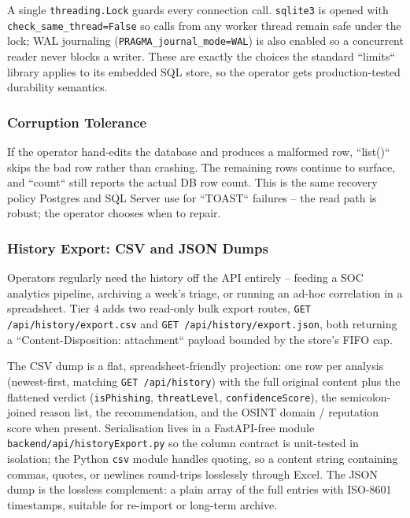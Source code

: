 A single \texttt{threading.Lock} guards every connection call. \texttt{sqlite3} is opened with \texttt{check\_same\_thread=False} so calls from any worker thread remain safe under the lock; WAL journaling (\texttt{PRAGMA\_journal\_mode=WAL}) is also enabled so a concurrent reader never blocks a writer. These are exactly the choices the standard ``limits`` library applies to its embedded SQL store, so the operator gets production-tested durability semantics.

\subsubsection{Corruption Tolerance}

If the operator hand-edits the database and produces a malformed row, ``list()`` skips the bad row rather than crashing. The remaining rows continue to surface, and ``count`` still reports the actual DB row count. This is the same recovery policy Postgres and SQL Server use for ``TOAST`` failures -- the read path is robust; the operator chooses when to repair.

\subsubsection{History Export: CSV and JSON Dumps}

Operators regularly need the history off the API entirely -- feeding a
SOC analytics pipeline, archiving a week's triage, or running an
ad-hoc correlation in a spreadsheet.  Tier 4 adds two read-only bulk
export routes, \texttt{GET \hspace{0pt}/api/history/export.csv} and
\texttt{GET \hspace{0pt}/api/history/export.json}, both returning a
``Content-Disposition: attachment`` payload bounded by the store's
FIFO cap.

The CSV dump is a flat, spreadsheet-friendly projection: one row per
analysis (newest-first, matching \texttt{GET /api/history}) with the
full original content plus the flattened verdict (\texttt{isPhishing},
\texttt{threatLevel}, \texttt{confidenceScore}), the semicolon-joined
reason list, the recommendation, and the OSINT domain / reputation
score when present.  Serialisation lives in a FastAPI-free module
\texttt{backend/api/historyExport.py} so the column contract is
unit-tested in isolation; the Python \texttt{csv} module handles
quoting, so a content string containing commas, quotes, or newlines
round-trips losslessly through Excel.  The JSON dump is the lossless
complement: a plain array of the full entries with ISO-8601
timestamps, suitable for re-import or long-term archive.

